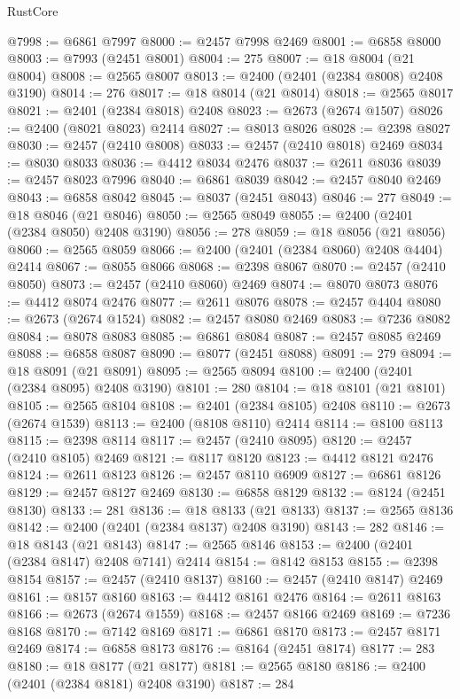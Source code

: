 \begin{lexlean}{RustCore}
\begin{coremodule}
@7998 := @6861 @7997
@8000 := @2457 @7998 @2469
@8001 := @6858 @8000
@8003 := @7993 (@2451 @8001)
@8004 := 275
@8007 := @18 @8004 (@21 @8004)
@8008 := @2565 @8007
@8013 := @2400 (@2401 (@2384 @8008) @2408 @3190)
@8014 := 276
@8017 := @18 @8014 (@21 @8014)
@8018 := @2565 @8017
@8021 := @2401 (@2384 @8018) @2408
@8023 := @2673 (@2674 @1507)
@8026 := @2400 (@8021 @8023) @2414
@8027 := @8013 @8026
@8028 := @2398 @8027
@8030 := @2457 (@2410 @8008)
@8033 := @2457 (@2410 @8018) @2469
@8034 := @8030 @8033
@8036 := @4412 @8034 @2476
@8037 := @2611 @8036
@8039 := @2457 @8023 @7996
@8040 := @6861 @8039
@8042 := @2457 @8040 @2469
@8043 := @6858 @8042
@8045 := @8037 (@2451 @8043)
@8046 := 277
@8049 := @18 @8046 (@21 @8046)
@8050 := @2565 @8049
@8055 := @2400 (@2401 (@2384 @8050) @2408 @3190)
@8056 := 278
@8059 := @18 @8056 (@21 @8056)
@8060 := @2565 @8059
@8066 := @2400 (@2401 (@2384 @8060) @2408 @4404) @2414
@8067 := @8055 @8066
@8068 := @2398 @8067
@8070 := @2457 (@2410 @8050)
@8073 := @2457 (@2410 @8060) @2469
@8074 := @8070 @8073
@8076 := @4412 @8074 @2476
@8077 := @2611 @8076
@8078 := @2457 @4404
@8080 := @2673 (@2674 @1524)
@8082 := @2457 @8080 @2469
@8083 := @7236 @8082
@8084 := @8078 @8083
@8085 := @6861 @8084
@8087 := @2457 @8085 @2469
@8088 := @6858 @8087
@8090 := @8077 (@2451 @8088)
@8091 := 279
@8094 := @18 @8091 (@21 @8091)
@8095 := @2565 @8094
@8100 := @2400 (@2401 (@2384 @8095) @2408 @3190)
@8101 := 280
@8104 := @18 @8101 (@21 @8101)
@8105 := @2565 @8104
@8108 := @2401 (@2384 @8105) @2408
@8110 := @2673 (@2674 @1539)
@8113 := @2400 (@8108 @8110) @2414
@8114 := @8100 @8113
@8115 := @2398 @8114
@8117 := @2457 (@2410 @8095)
@8120 := @2457 (@2410 @8105) @2469
@8121 := @8117 @8120
@8123 := @4412 @8121 @2476
@8124 := @2611 @8123
@8126 := @2457 @8110 @6909
@8127 := @6861 @8126
@8129 := @2457 @8127 @2469
@8130 := @6858 @8129
@8132 := @8124 (@2451 @8130)
@8133 := 281
@8136 := @18 @8133 (@21 @8133)
@8137 := @2565 @8136
@8142 := @2400 (@2401 (@2384 @8137) @2408 @3190)
@8143 := 282
@8146 := @18 @8143 (@21 @8143)
@8147 := @2565 @8146
@8153 := @2400 (@2401 (@2384 @8147) @2408 @7141) @2414
@8154 := @8142 @8153
@8155 := @2398 @8154
@8157 := @2457 (@2410 @8137)
@8160 := @2457 (@2410 @8147) @2469
@8161 := @8157 @8160
@8163 := @4412 @8161 @2476
@8164 := @2611 @8163
@8166 := @2673 (@2674 @1559)
@8168 := @2457 @8166 @2469
@8169 := @7236 @8168
@8170 := @7142 @8169
@8171 := @6861 @8170
@8173 := @2457 @8171 @2469
@8174 := @6858 @8173
@8176 := @8164 (@2451 @8174)
@8177 := 283
@8180 := @18 @8177 (@21 @8177)
@8181 := @2565 @8180
@8186 := @2400 (@2401 (@2384 @8181) @2408 @3190)
@8187 := 284

\end{coremodule}
\end{lexlean}
